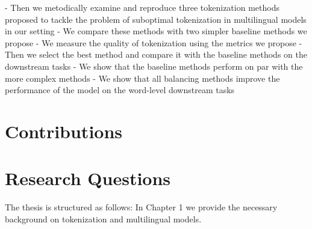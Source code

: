 - Then we metodically examine and reproduce three tokenization methods \citep{chung_improving_2020,zheng_allocating_2021,liang_xlm-v_2023} proposed to tackle the problem of suboptimal tokenization in multilingual models in our setting
- We compare these methods with two simpler baseline methods we propose
- We measure the quality of tokenization using the metrics we propose
- Then we select the best method and compare it with the baseline methods on the downstream tasks
- We show that the baseline methods perform on par with the more complex methods
- We show that all balancing methods improve the performance of the model on the word-level downstream tasks

\section{Contributions}

\section{Research Questions}

The thesis is structured as follows: In Chapter 1 we provide the necessary background on tokenization and multilingual models. 



